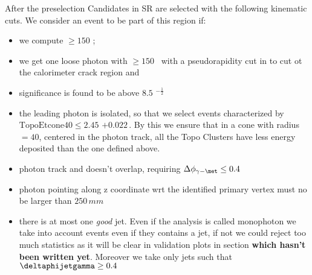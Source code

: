 After the preselection
Candidates in SR are selected with the following kinematic cuts. We consider an event to be part of this region if:
\begin{itemize}
\item we compute \met $ \ge 150 $ \GeV;
\item we get one loose photon with \pt $ \ge 150 $ \GeV $\,$ with a pseudorapidity cut in  to cut ot the calorimeter crack region and 
\item \met significance is found to be above $8.5$ \GeV$^{-\frac{1}{2}}$
\item the leading photon is isolated, so that we select events characterized by $ \text{TopoEtcone40} \le 2.45$ \GeV$ + 0.022 \, $\pt \GeV. By this we ensure that in a cone with radius \DeltaRdef $ = 40$, centered in the photon track, all the Topo Clusters have less energy deposited than the one defined above.
\item photon track and \met doesn't overlap, requiring $\Delta\phi_{\gamma - \met} \le 0.4$
\item photon pointing along z coordinate wrt the identified primary vertex must no be larger than $250 \, mm$
\item there is at most one {\itshape good} jet. Even if the analysis is called monophoton we take into account events even if they contains a jet, if not we could reject too much statistics as it will be clear in validation plots in section {\bfseries which hasn't been written yet}. Moreover we take only jets such that $\deltaphijetgamma \ge 0.4$

\end{itemize}

  

  
